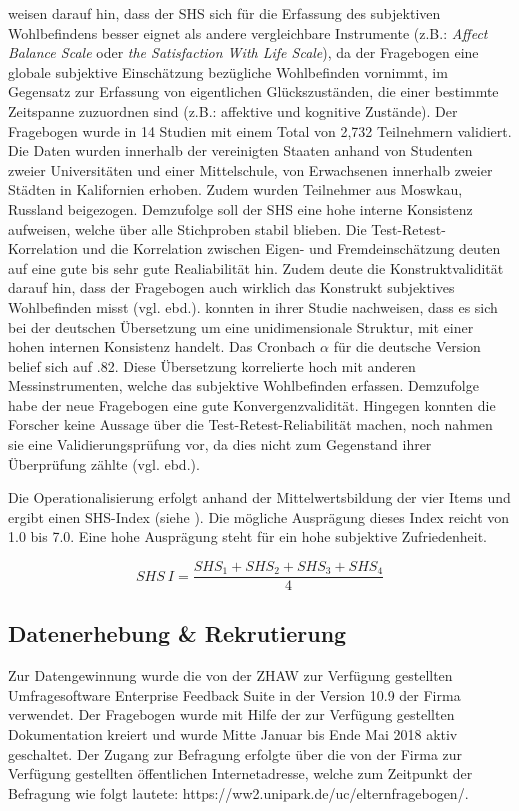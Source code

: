  weisen darauf hin, dass der SHS sich für die Erfassung des subjektiven Wohlbefindens besser eignet als andere vergleichbare Instrumente (z.B.: \textit{Affect Balance Scale} oder \textit{the Satisfaction With Life Scale}), da der Fragebogen eine globale subjektive Einschätzung bezügliche Wohlbefinden vornimmt, im Gegensatz zur Erfassung von eigentlichen Glückszuständen, die einer bestimmte Zeitspanne zuzuordnen sind (z.B.: affektive und kognitive Zustände). Der Fragebogen wurde in 14 Studien mit einem Total von 2,732 Teilnehmern validiert. Die Daten wurden innerhalb der vereinigten Staaten anhand von Studenten zweier Universitäten und einer Mittelschule, von Erwachsenen innerhalb zweier Städten in Kalifornien   erhoben. Zudem wurden Teilnehmer aus Moswkau, Russland beigezogen. Demzufolge soll der SHS eine hohe interne Konsistenz aufweisen, welche über alle Stichproben stabil blieben. Die Test-Retest-Korrelation und die Korrelation zwischen Eigen- und Fremdeinschätzung deuten auf eine gute bis sehr gute Realiabilität hin.  
Zudem deute die Konstruktvalidität darauf hin, dass der Fragebogen auch wirklich das Konstrukt subjektives Wohlbefinden misst (vgl. ebd.).  konnten in ihrer Studie nachweisen, dass es sich bei der deutschen Übersetzung um eine unidimensionale Struktur, mit einer hohen internen Konsistenz handelt. Das Cronbach $\alpha$ für die deutsche Version belief sich auf .82. Diese Übersetzung korrelierte hoch mit anderen Messinstrumenten, welche das subjektive Wohlbefinden erfassen. Demzufolge habe der neue Fragebogen eine gute Konvergenzvalidität. Hingegen konnten die Forscher keine Aussage über die Test-Retest-Reliabilität machen, noch nahmen sie eine Validierungsprüfung vor, da dies nicht zum Gegenstand ihrer Überprüfung zählte (vgl. ebd.).

Die Operationalisierung erfolgt anhand der Mittelwertsbildung der vier Items \cite{Lyubomirsky1999} und ergibt einen SHS-Index (siehe ). Die mögliche Ausprägung dieses Index reicht von 1.0 bis 7.0. Eine hohe Ausprägung steht für ein hohe subjektive Zufriedenheit.

\begin{equation}\label{eq:SHS}
    SHS~I=\frac{SHS_{1}+SHS_{2}+SHS_{3}+SHS_{4}}{4}
\end{equation}

\subsection{Datenerhebung \& Rekrutierung}
Zur Datengewinnung wurde die von der ZHAW zur Verfügung gestellten Umfragesoftware Enterprise Feedback Suite in der Version 10.9 der Firma  verwendet. Der Fragebogen wurde mit Hilfe der zur Verfügung gestellten Dokumentation kreiert \cite{EFS2016} und wurde Mitte Januar bis Ende Mai 2018 aktiv geschaltet.  Der Zugang zur Befragung erfolgte über die von der Firma  zur Verfügung gestellten öffentlichen Internetadresse, welche zum Zeitpunkt der Befragung wie folgt lautete: https://ww2.unipark.de/uc/elternfragebogen/.

